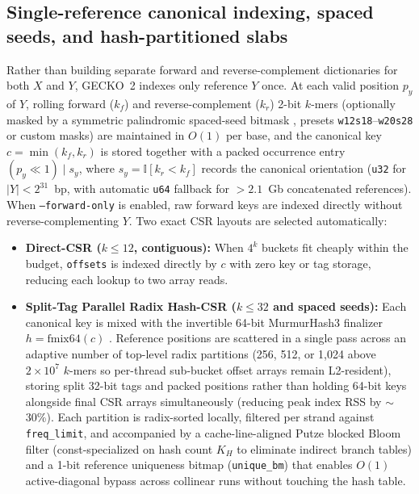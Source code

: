 \documentclass[pdflatex,sn-vancouver,Numbered]{sn-jnl}
\begin{document}
\subsection{Single-reference canonical indexing, spaced seeds, and hash-partitioned slabs}\label{subsec:refindex}

Rather than building separate forward and reverse-complement dictionaries for both $X$ and $Y$, GECKO~2 indexes only reference $Y$ once. At each valid position $p_y$ of $Y$, rolling forward ($k_f$) and reverse-complement ($k_r$) 2-bit $k$-mers (optionally masked by a symmetric palindromic spaced-seed bitmask \cite{ma2002patternhunter}, presets \texttt{w12s18}--\texttt{w20s28} or custom masks) are maintained in $O(1)$ per base, and the canonical key $c = \min(k_f, k_r)$ is stored together with a packed occurrence entry $(p_y \ll 1) \mid s_y$, where $s_y = \mathbb{I}[k_r < k_f]$ records the canonical orientation (\texttt{u32} for $|Y| < 2^{31}$~bp, with automatic \texttt{u64} fallback for $>2.1$~Gb concatenated references). When \texttt{--forward-only} is enabled, raw forward keys are indexed directly without reverse-complementing $Y$. Two exact CSR layouts are selected automatically:
\begin{itemize}
    \item \textbf{Direct-CSR ($k \le 12$, contiguous):} When $4^k$ buckets fit cheaply within the budget, \texttt{offsets} is indexed directly by $c$ with zero key or tag storage, reducing each lookup to two array reads.
    \item \textbf{Split-Tag Parallel Radix Hash-CSR ($k \le 32$ and spaced seeds):} Each canonical key is mixed with the invertible 64-bit MurmurHash3 finalizer $h = \text{fmix64}(c)$ \cite{appleby2011murmurhash3}. Reference positions are scattered in a single pass across an adaptive number of top-level radix partitions (256, 512, or 1,024 above $2\times 10^7$ $k$-mers so per-thread sub-bucket offset arrays remain L2-resident), storing split 32-bit tags and packed positions rather than holding 64-bit keys alongside final CSR arrays simultaneously (reducing peak index RSS by $\sim$30\%). Each partition is radix-sorted locally, filtered per strand against \texttt{freq\_limit}, and accompanied by a cache-line-aligned Putze blocked Bloom filter \cite{putze2009bloom} (const-specialized on hash count $K_H$ to eliminate indirect branch tables) and a 1-bit reference uniqueness bitmap (\texttt{unique\_bm}) that enables $O(1)$ active-diagonal bypass across collinear runs without touching the hash table.
\end{itemize}
\end{document}
